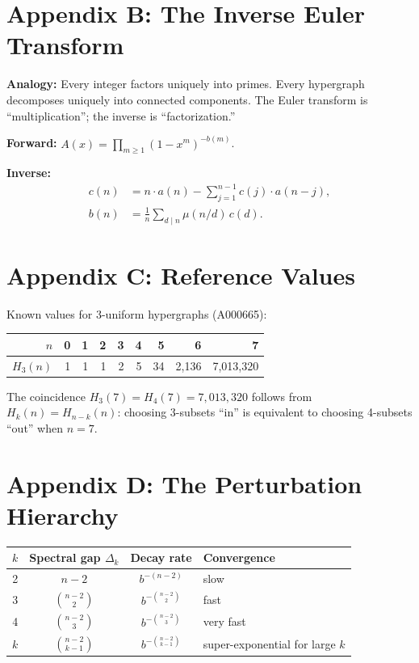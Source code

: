 \documentclass[11pt,letterpaper]{article}
\theoremstyle{definition}
\theoremstyle{remark}
\begin{document}
\section*{Appendix B: The Inverse Euler Transform}

\textbf{Analogy:} Every integer factors uniquely into primes. Every hypergraph decomposes uniquely into connected components. The Euler transform is ``multiplication''; the inverse is ``factorization.''

\textbf{Forward:} $A(x) = \prod_{m \geq 1} (1 - x^m)^{-b(m)}$.

\textbf{Inverse:}
\begin{align*}
c(n) &= n \cdot a(n) - \textstyle\sum_{j=1}^{n-1} c(j) \cdot a(n-j), \\
b(n) &= \frac{1}{n} \textstyle\sum_{d \mid n} \mu(n/d)\, c(d).
\end{align*}

\section*{Appendix C: Reference Values}

Known values for 3-uniform hypergraphs (A000665):
{\small
\begin{center}
\begin{tabular}{r|rrrrrrrr}
\toprule
$n$ & 0 & 1 & 2 & 3 & 4 & 5 & 6 & 7 \\
\midrule
$H_3(n)$ & 1 & 1 & 1 & 2 & 5 & 34 & 2{,}136 & 7{,}013{,}320 \\
\bottomrule
\end{tabular}
\end{center}
}

\noindent The coincidence $H_3(7) = H_4(7) = 7{,}013{,}320$ follows from $H_k(n) = H_{n-k}(n)$: choosing 3-subsets ``in'' is equivalent to choosing 4-subsets ``out'' when $n = 7$.

\section*{Appendix D: The Perturbation Hierarchy}

\begin{center}
\begin{tabular}{cccl}
\toprule
$k$ & Spectral gap $\Delta_k$ & Decay rate & Convergence \\
\midrule
2 & $n - 2$ & $b^{-(n-2)}$ & slow \\
3 & $\binom{n-2}{2}$ & $b^{-\binom{n-2}{2}}$ & fast \\
4 & $\binom{n-2}{3}$ & $b^{-\binom{n-2}{3}}$ & very fast \\
$k$ & $\binom{n-2}{k-1}$ & $b^{-\binom{n-2}{k-1}}$ & super-exponential for large $k$ \\
\bottomrule
\end{tabular}
\end{center}
\end{document}
